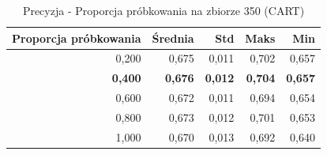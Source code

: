 \begin{table}[htbp]
\centering
\small
\setlength{\tabcolsep}{6pt}
\renewcommand{\arraystretch}{1.2}
\caption{Precyzja - Proporcja próbkowania na zbiorze 350 (CART)}
\label{tab:CART_sample_ratio_350_precision}
\begin{tabular}{r|r|r|r|r}
\toprule
Proporcja próbkowania & Średnia & Std & Maks & Min \\
\hline
0,200 & 0,675 & 0,011 & 0,702 & 0,657 \\
\textbf{0,400} & \textbf{0,676} & \textbf{0,012} & \textbf{0,704} & \textbf{0,657} \\
0,600 & 0,672 & 0,011 & 0,694 & 0,654 \\
0,800 & 0,673 & 0,012 & 0,701 & 0,653 \\
1,000 & 0,670 & 0,013 & 0,692 & 0,640 \\
\bottomrule
\end{tabular}
\end{table}